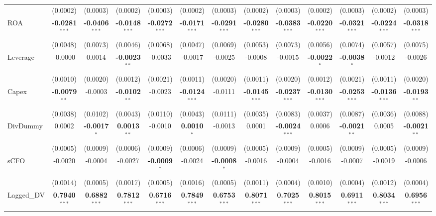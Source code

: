 \documentclass[11pt,a4paper]{article}
\begin{document}
\begin{table}[htbp]
\begin{tabular}{lcccccccccccc}
 & (0.0002) & (0.0003) & (0.0002) & (0.0003) & (0.0002) & (0.0003) & (0.0002) & (0.0003) & (0.0002) & (0.0003) & (0.0002) & (0.0003) \\
ROA & \textbf{-0.0281}$^{***}$ & \textbf{-0.0406}$^{***}$ & \textbf{-0.0148}$^{***}$ & \textbf{-0.0272}$^{***}$ & \textbf{-0.0171}$^{***}$ & \textbf{-0.0291}$^{***}$ & \textbf{-0.0280}$^{***}$ & \textbf{-0.0383}$^{***}$ & \textbf{-0.0220}$^{***}$ & \textbf{-0.0321}$^{***}$ & \textbf{-0.0224}$^{***}$ & \textbf{-0.0318}$^{***}$ \\
 & (0.0048) & (0.0073) & (0.0046) & (0.0068) & (0.0047) & (0.0069) & (0.0053) & (0.0073) & (0.0056) & (0.0074) & (0.0057) & (0.0075) \\
Leverage & -0.0000 & 0.0014 & \textbf{-0.0023}$^{**}$ & -0.0033 & -0.0017 & -0.0025 & -0.0008 & -0.0015 & \textbf{-0.0022}$^{*}$ & \textbf{-0.0038}$^{*}$ & -0.0012 & -0.0026 \\
 & (0.0010) & (0.0020) & (0.0012) & (0.0021) & (0.0011) & (0.0020) & (0.0011) & (0.0020) & (0.0012) & (0.0021) & (0.0011) & (0.0020) \\
Capex & \textbf{-0.0079}$^{**}$ & -0.0003 & \textbf{-0.0102}$^{**}$ & -0.0023 & \textbf{-0.0124}$^{***}$ & -0.0111 & \textbf{-0.0145}$^{***}$ & \textbf{-0.0237}$^{***}$ & \textbf{-0.0130}$^{***}$ & \textbf{-0.0253}$^{***}$ & \textbf{-0.0136}$^{***}$ & \textbf{-0.0193}$^{**}$ \\
 & (0.0038) & (0.0102) & (0.0043) & (0.0110) & (0.0043) & (0.0111) & (0.0035) & (0.0083) & (0.0037) & (0.0087) & (0.0036) & (0.0088) \\
DivDummy & 0.0002 & \textbf{-0.0017}$^{*}$ & \textbf{0.0013}$^{**}$ & -0.0010 & \textbf{0.0010}$^{*}$ & -0.0013 & 0.0001 & \textbf{-0.0024}$^{***}$ & 0.0006 & \textbf{-0.0021}$^{**}$ & 0.0005 & \textbf{-0.0021}$^{**}$ \\
 & (0.0005) & (0.0009) & (0.0006) & (0.0009) & (0.0006) & (0.0009) & (0.0005) & (0.0009) & (0.0005) & (0.0009) & (0.0005) & (0.0009) \\
sCFO & -0.0020 & -0.0004 & -0.0027 & \textbf{-0.0009}$^{*}$ & -0.0024 & \textbf{-0.0008}$^{*}$ & -0.0016 & -0.0004 & -0.0016 & -0.0007 & -0.0019 & -0.0006 \\
 & (0.0014) & (0.0005) & (0.0017) & (0.0005) & (0.0016) & (0.0005) & (0.0011) & (0.0004) & (0.0010) & (0.0004) & (0.0012) & (0.0004) \\
Lagged\_DV & \textbf{0.7940}$^{***}$ & \textbf{0.6882}$^{***}$ & \textbf{0.7812}$^{***}$ & \textbf{0.6716}$^{***}$ & \textbf{0.7849}$^{***}$ & \textbf{0.6753}$^{***}$ & \textbf{0.8071}$^{***}$ & \textbf{0.7025}$^{***}$ & \textbf{0.8015}$^{***}$ & \textbf{0.6911}$^{***}$ & \textbf{0.8034}$^{***}$ & \textbf{0.6956}$^{***}$ \\

\end{tabular}
\end{table}
\end{document}
